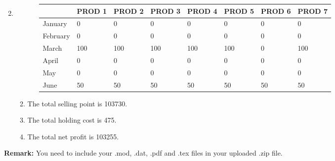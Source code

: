 \documentclass[12pt,a4paper]{article}
\makeatletter
\newtheorem*{solution}{Solution}
\theoremstyle{definition}
\renewenvironment{solution}[1][Solution] {\par\pushQED{\qed}\normalfont\topsep6\p@\@plus6\p@\relax\trivlist\item[\hskip\labelsep\bfseries#1\@addpunct{.}]\ignorespaces}{\popQED\endtrivlist\@endpefalse} \makeatother
\makeatother
\begin{document}
\begin{enumerate}
\begin{solution}
\begin{enumerate}
\begin{enumerate}
	\begin{table}[ht]
		\scriptsize
		\centering
		\renewcommand\arraystretch{1.1}
		\begin{tabular}{m{} m{}<{\centering} m{}<{\centering} m{}<{\centering} m{}<{\centering} m{}<{\centering} m{}<{\centering} m{}<{\centering}}
			\hline
			& \textbf{PROD 1} & \textbf{PROD 2} & \textbf{PROD 3} & \textbf{PROD 4} & \textbf{PROD 5} & \textbf{PROD 6} &  \textbf{PROD 7} \\\hline
			January & 0 & 0 & 0 & 0 & 0 & 0 & 0 \\
			February & 0 & 0 & 0 & 0 & 0 & 0 & 0 \\
			March & 100 & 100 & 100 & 100 & 100 & 0 & 100 \\
			April & 0 & 0 & 0 & 0 & 0 & 0 & 0 \\
			May & 0 & 0 & 0 & 0 & 0 & 0 & 0 \\
			June & 50 & 50 & 50 & 50 & 50 & 50 & 50 \\
			\hline
		\end{tabular}
	\end{table}
	\end{enumerate}
	\item The total selling point is 103730.
	\item The total holding cost is 475.
	\item The total net profit is 103255.
	\end{enumerate}
\end{solution}
\end{enumerate}

\vspace{20pt}

\textbf{Remark:} You need to include your .mod, .dat, .pdf and .tex files in your uploaded .zip file.

\end{document}
